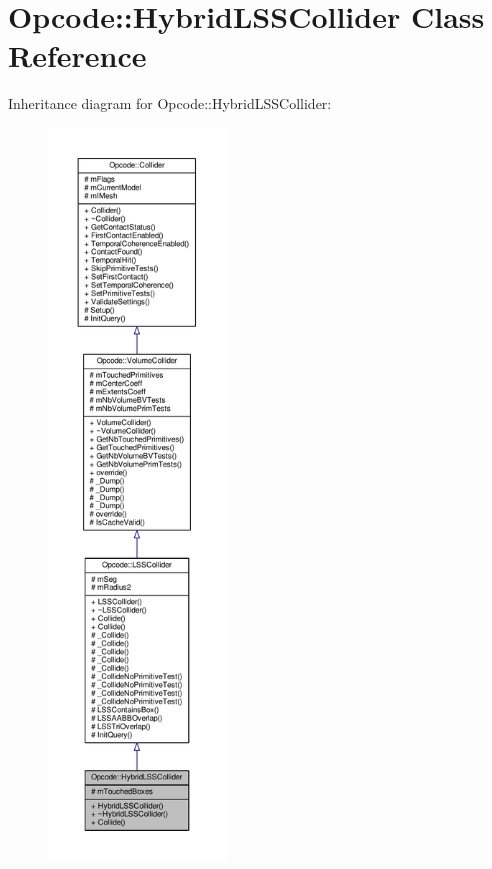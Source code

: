 \hypertarget{classOpcode_1_1HybridLSSCollider}{}\section{Opcode\+:\+:Hybrid\+L\+S\+S\+Collider Class Reference}
\label{classOpcode_1_1HybridLSSCollider}


Inheritance diagram for Opcode\+:\+:Hybrid\+L\+S\+S\+Collider\+:
\nopagebreak
\begin{figure}[H]
\begin{center}
\leavevmode
\includegraphics[height=550pt]{d2/d87/classOpcode_1_1HybridLSSCollider__inherit__graph}
\end{center}
\end{figure}


